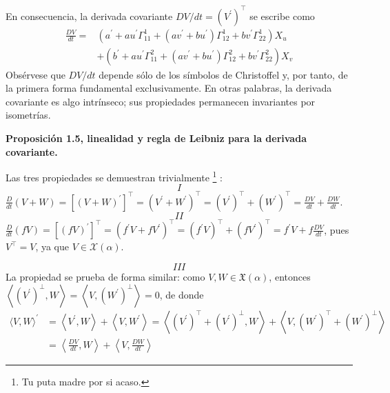 \documentclass[openany]{book}
\begin{document}
\begin{demonstration}
En consecuencia, la derivada covariante $D V / d t=\left(V^{\prime}\right)^{\top}$ se escribe como
$$
\begin{aligned}
\frac{D V}{d t}=&\left(a^{\prime}+a u^{\prime} \Gamma_{11}^{1}+\left(a v^{\prime}+b u^{\prime}\right) \Gamma_{12}^{1}+b v^{\prime} \Gamma_{22}^{1}\right) X_{u} \\
&+\left(b^{\prime}+a u^{\prime} \Gamma_{11}^{2}+\left(a v^{\prime}+b u^{\prime}\right) \Gamma_{12}^{2}+b v^{\prime} \Gamma_{22}^{2}\right) X_{v}
\end{aligned}
$$
Obsérvese que $D V / d t$ depende sólo de los símbolos de Christoffel y, por tanto, de la primera forma fundamental exclusivamente. En otras palabras, la derivada covariante es algo intrínseco; sus propiedades permanecen invariantes por isometrías.
\end{demonstration}

\begin{center}
\textbf{Proposición 1.5, linealidad y regla de Leibniz para la derivada covariante.}
\end{center}
\begin{demonstration}
  Las tres propiedades se demuestran trivialmente \footnote{Tu puta madre por si acaso.} :
    $$ I $$
 $\frac{D}{d t}(V+W)=\left[(V+W)^{\prime}\right]^{\top}=\left(V^{\prime}+W^{\prime}\right)^{\top}=\left(V^{\prime}\right)^{\top}+\left(W^{\prime}\right)^{\top}=\frac{D V}{d t}+\frac{D W}{d t}$.
  $$ II $$
 $\frac{D}{d t}(f V)=\left[(f V)^{\prime}\right]^{\top}=\left(f^{\prime} V+f V^{\prime}\right)^{\top}=\left(f^{\prime} V\right)^{\top}+\left(f V^{\prime}\right)^{\top}=f^{\prime} V+f \frac{D V}{d t}$,
pues $V^{\top}=V$, ya que $V \in \mathcal{X}(\alpha)$.

$$ III $$
La propiedad se prueba de forma similar: como $V, W \in \mathfrak{X}(\alpha)$, entonces $\left\langle\left(V^{\prime}\right)^{\perp}, W\right\rangle=\left\langle V,\left(W^{\prime}\right)^{\perp}\right\rangle=0$, de donde
$$
\begin{aligned}
\langle V, W\rangle^{\prime} &=\left\langle V^{\prime}, W\right\rangle+\left\langle V, W^{\prime}\right\rangle=\left\langle\left(V^{\prime}\right)^{\top}+\left(V^{\prime}\right)^{\perp}, W\right\rangle+\left\langle V,\left(W^{\prime}\right)^{\top}+\left(W^{\prime}\right)^{\perp}\right\rangle \\
&=\left\langle\frac{D V}{d t}, W\right\rangle+\left\langle V, \frac{D W}{d t}\right\rangle
\end{aligned}
$$
\end{demonstration}
\end{document}
